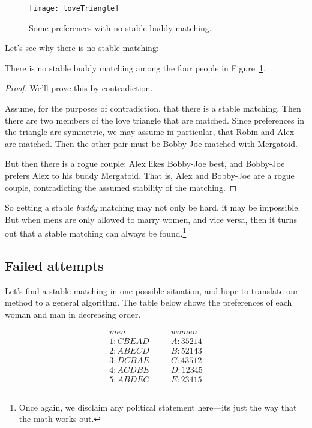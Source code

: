 \begin{figure}[htbp]
\texttt{[image: loveTriangle]}
\caption{Some preferences with no stable buddy matching.}
\label{fig:buddy}
\end{figure}

Let's see why there is no stable matching:
\begin{lemma}\label{lem:nostablematch}
There is no stable buddy matching among the four people in
Figure~\ref{fig:buddy}.
\end{lemma}

\begin{proof}
We'll prove this by contradiction.

Assume, for the purposes of contradiction, that there is a stable
matching.  Then there are two members of the love triangle that are
matched.  Since preferences in the triangle are symmetric, we may assume
in particular, that Robin and Alex are matched.  Then the other pair must
be Bobby-Joe matched with Mergatoid.

But then there is a rogue couple: Alex likes Bobby-Joe best, and Bobby-Joe
prefers Alex to his buddy Mergatoid.  That is, Alex and Bobby-Joe are a
rogue couple, contradicting the assumed stability of the matching.
\end{proof}

So getting a stable \emph{buddy} matching may not only be hard, it may
be impossible.  But when mens are only allowed to marry women, and
vice versa, then it turns out that a stable matching can always be
found.\footnote{Once again, we disclaim any political statement
  here---its just the way that the math works out.}


\iffalse

\subsection{Failed attempts}

Let's find a stable matching in one possible situation, and hope to
translate our method to a general algorithm.  The table below shows the
preferences of each woman and man in decreasing order.

\begin{eqnarray*}
men & \quad & women \\
1 : C B E A D & \quad & A : 3 5 2 1 4 \\
2 : A B E C D & \quad & B : 5 2 1 4 3 \\
3 : D C B A E & \quad & C : 4 3 5 1 2 \\
4 : A C D B E & \quad & D : 1 2 3 4 5 \\
5 : A B D E C & \quad & E : 2 3 4 1 5
\end{eqnarray*}

